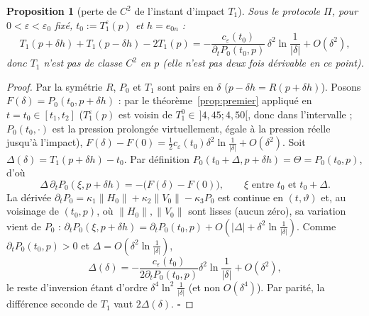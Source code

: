 \documentclass[11pt,a4paper]{article}
\newtheorem{proposition}[theoreme]{Proposition}
\theoremstyle{remark}
\newcommand{\vth}{\vartheta}
\begin{document}
\begin{proposition}[perte de $C^2$ de l'instant d'impact $T_1$]\label{cor:T1}
Sous le protocole $\Pi$, pour $0<\varepsilon<\varepsilon_0$ fixé, $t_0:=T_1^\varepsilon(p)$ et $h=e_{0n}$ :
\[
T_1(p+\delta h)+T_1(p-\delta h)-2T_1(p)=-\frac{c_\varepsilon(t_0)}{\partial_tP_0(t_0,p)}\,\delta^2\ln\frac1{\lvert\delta\rvert}+O(\delta^2),
\]
donc $T_1$ n'est pas de classe $C^2$ en $p$ (elle n'est pas deux fois dérivable en ce point).
\end{proposition}
\begin{proof}
Par la symétrie $R$, $P_0$ et $T_1$ sont pairs en $\delta$ ($p-\delta h=R(p+\delta h)$). Posons $F(\delta)=P_0(t_0,p+\delta h)$ : par le théorème~\ref{prop:premier} appliqué en $t=t_0\in[t_1,t_2]$ ($T_1^\varepsilon(p)$ est voisin de $T_1^0\in\,]4{,}45;4{,}50[$, donc dans l'intervalle ; $P_0(t_0,\cdot)$ est la pression prolongée virtuellement, égale à la pression réelle jusqu'à l'impact), $F(\delta)-F(0)=\tfrac12c_\varepsilon(t_0)\delta^2\ln\frac1{\lvert\delta\rvert}+O(\delta^2)$. Soit $\Delta(\delta)=T_1(p+\delta h)-t_0$. Par définition $P_0(t_0+\Delta,p+\delta h)=\Theta=P_0(t_0,p)$, d'où
\[
\Delta\,\partial_tP_0(\xi,p+\delta h)=-\bigl(F(\delta)-F(0)\bigr),\qquad\xi\text{ entre }t_0\text{ et }t_0+\Delta .
\]
La dérivée $\partial_tP_0=\kappa_1\lVert H_0\rVert+\kappa_2\lVert V_0\rVert-\kappa_3P_0$ est continue en $(t,\vth)$ et, au voisinage de $(t_0,p)$, où $\lVert H_0\rVert,\lVert V_0\rVert$ sont lisses (aucun zéro), sa variation vient de $P_0$ : $\partial_tP_0(\xi,p+\delta h)=\partial_tP_0(t_0,p)+O(\lvert\Delta\rvert+\delta^2\ln\frac1{\lvert\delta\rvert})$. Comme $\partial_tP_0(t_0,p)>0$ et $\Delta=O(\delta^2\ln\frac1{\lvert\delta\rvert})$,
\[
\Delta(\delta)=-\frac{c_\varepsilon(t_0)}{2\partial_tP_0(t_0,p)}\delta^2\ln\frac1{\lvert\delta\rvert}+O(\delta^2),
\]
le reste d'inversion étant d'ordre $\delta^4\ln^2\frac1{\lvert\delta\rvert}$ (et non $O(\delta^4)$). Par parité, la différence seconde de $T_1$ vaut $2\Delta(\delta)$. $\square$
\end{proof}
\end{document}
